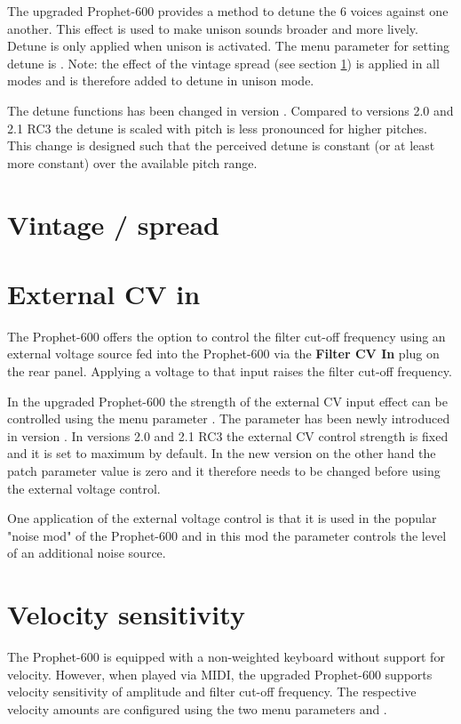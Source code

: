 \documentclass[landscape, 11pt, oneside, twoside]{report}
\newenvironment{flowtext}{\addmargin[0cm]{0cm}}{\endaddmargin} %
\begin{document}
\begin{flowtext}
The upgraded Prophet-600 provides a method to detune the 6 voices against one another. This effect is used to make unison sounds broader and more lively. Detune is only applied when unison is activated. The menu parameter for setting detune is \detune. Note: the effect of the vintage spread (see section \ref{spreadsett}) is applied in all modes and is therefore added to detune in unison mode. 

The detune functions has been changed in version \version. Compared to versions 2.0 and 2.1 RC3 the detune is scaled with pitch is less pronounced for higher pitches. This change is designed such that the perceived detune is constant (or at least more constant) over the available pitch range. 

\section{Vintage / spread}\label{spreadsett}



\section{External CV in}\label{extcv}

The Prophet-600 offers the option to control the filter cut-off frequency using an external voltage source fed into the Prophet-600 via the \textbf{Filter CV In} plug on the rear panel. Applying a voltage to that input raises the filter cut-off frequency.

In the upgraded Prophet-600 the strength of the external CV input effect can be controlled using the menu parameter \extvolt. The parameter has been newly introduced in version \version. In versions 2.0 and 2.1 RC3 the external CV control strength is fixed and it is set to maximum by default. In the new version on the other hand the patch parameter value is zero and it therefore needs to be changed before using the external voltage control. 

One application of the external voltage control is that it is used in the popular "noise mod" of the Prophet-600 and in this mod the parameter controls the level of an additional noise source. 

\section{Velocity sensitivity}\label{velocity}

The Prophet-600 is equipped with a non-weighted keyboard without support for velocity. However, when played via MIDI, the upgraded Prophet-600 supports velocity sensitivity of amplitude and filter cut-off frequency. The respective velocity amounts are configured using the two menu parameters \ampvel and \filvel.


\end{flowtext}
\end{document}
